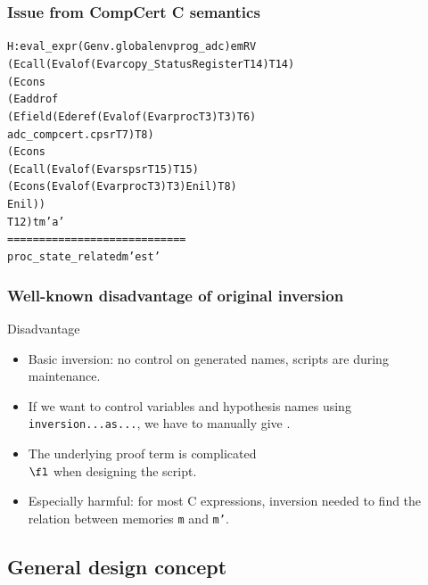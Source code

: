\documentclass[usenames,dvipsnames]{beamer} %
\begin{document}
\begin{frame}[fragile]
\frametitle{Issue from CompCert C semantics}
\small
\begin{alltt}
H:eval_expr (Genv.globalenv prog_adc) e m RV
   (Ecall (Evalof (Evar copy_StatusRegister T14) T14)
      (Econs
         (Eaddrof
            (Efield (Ederef (Evalof (Evar proc T3) T3) T6)
              adc_compcert.cpsr T7) T8)
         (Econs
            (Ecall (Evalof (Evar spsr T15) T15)
               (Econs (Evalof (Evar proc T3) T3) Enil) T8)
                Enil))
      T12) t m' a'
============================
   proc_state_related m' e st'
\end{alltt}
\begin{alltt}
\end{alltt}
\end{frame}
\begin{frame}


\frametitle{Well-known disadvantage of original inversion}
\begin{block}{Disadvantage}
\begin{itemize}
\item Basic inversion: no control on generated names, scripts are  during maintenance.
\item
If we want to control variables and hypothesis names using \texttt{inversion...as...},
we have to manually give .
\item
The underlying proof term is complicated \\ 
$\fl$  when designing the script.
\item
Especially harmful:
for most C expressions, inversion needed  
to find the relation between memories \texttt{\Large m} and \texttt{\Large m'}.
\end{itemize}
\end{block}
\end{frame}

\subsection{General design concept}
\end{document}
